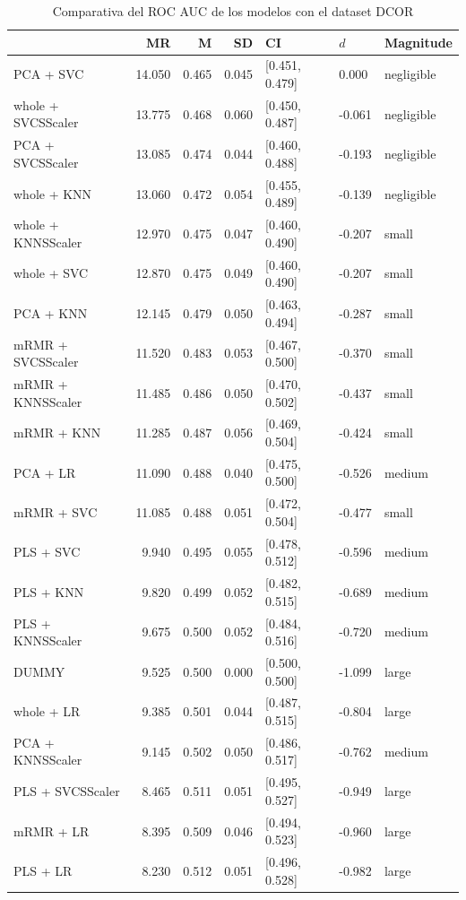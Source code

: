 \documentclass[a4paper,oneside,11pt,leqno]{article}
\begin{document}
	\begin{table}[h]
		\centering
		\begin{tabular}{lrrrlll}
			\toprule
			{} &     MR &     M &    SD &              CI &    $d$ &   Magnitude \\
			\midrule
			PCA + SVC          & 14.050 & 0.465 & 0.045 &  [0.451, 0.479] &  0.000 &  negligible \\
			whole + SVCSScaler & 13.775 & 0.468 & 0.060 &  [0.450, 0.487] & -0.061 &  negligible \\
			PCA + SVCSScaler   & 13.085 & 0.474 & 0.044 &  [0.460, 0.488] & -0.193 &  negligible \\
			whole + KNN        & 13.060 & 0.472 & 0.054 &  [0.455, 0.489] & -0.139 &  negligible \\
			whole + KNNSScaler & 12.970 & 0.475 & 0.047 &  [0.460, 0.490] & -0.207 &       small \\
			whole + SVC        & 12.870 & 0.475 & 0.049 &  [0.460, 0.490] & -0.207 &       small \\
			PCA + KNN          & 12.145 & 0.479 & 0.050 &  [0.463, 0.494] & -0.287 &       small \\
			mRMR + SVCSScaler  & 11.520 & 0.483 & 0.053 &  [0.467, 0.500] & -0.370 &       small \\
			mRMR + KNNSScaler  & 11.485 & 0.486 & 0.050 &  [0.470, 0.502] & -0.437 &       small \\
			mRMR + KNN         & 11.285 & 0.487 & 0.056 &  [0.469, 0.504] & -0.424 &       small \\
			PCA + LR           & 11.090 & 0.488 & 0.040 &  [0.475, 0.500] & -0.526 &      medium \\
			mRMR + SVC         & 11.085 & 0.488 & 0.051 &  [0.472, 0.504] & -0.477 &       small \\
			PLS + SVC          &  9.940 & 0.495 & 0.055 &  [0.478, 0.512] & -0.596 &      medium \\
			PLS + KNN          &  9.820 & 0.499 & 0.052 &  [0.482, 0.515] & -0.689 &      medium \\
			PLS + KNNSScaler   &  9.675 & 0.500 & 0.052 &  [0.484, 0.516] & -0.720 &      medium \\
			DUMMY              &  9.525 & 0.500 & 0.000 &  [0.500, 0.500] & -1.099 &       large \\
			whole + LR         &  9.385 & 0.501 & 0.044 &  [0.487, 0.515] & -0.804 &       large \\
			PCA + KNNSScaler   &  9.145 & 0.502 & 0.050 &  [0.486, 0.517] & -0.762 &      medium \\
			PLS + SVCSScaler   &  8.465 & 0.511 & 0.051 &  [0.495, 0.527] & -0.949 &       large \\
			mRMR + LR          &  8.395 & 0.509 & 0.046 &  [0.494, 0.523] & -0.960 &       large \\
			PLS + LR           &  8.230 & 0.512 & 0.051 &  [0.496, 0.528] & -0.982 &       large \\
			\bottomrule
		\end{tabular}
		\caption{Comparativa del ROC AUC de los modelos con el dataset DCOR}
		\label{tab:stat_results_dcor}
	\end{table}
	
\end{document}
